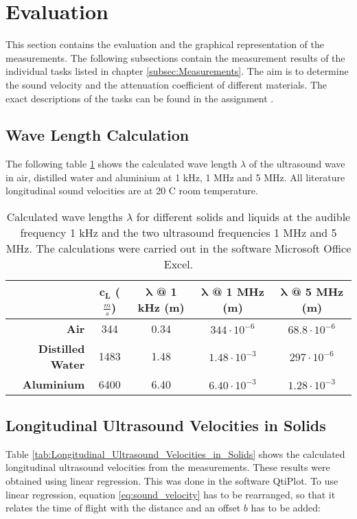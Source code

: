 \section{Evaluation}
\label{sec:Evaluation}
This section contains the evaluation and the graphical representation of the measurements. The following subsections contain the measurement results of the individual tasks listed in chapter \ref{subsec:Measurements}. The aim is to determine the sound velocity and the attenuation coefficient of different materials. The exact descriptions of the tasks can be found in the assignment \cite{ultrasound}.

\subsection{Wave Length Calculation}
\label{subsec:wave_length_calculation}
The following table \ref{tab:wave_length_calculation} shows the calculated wave length $\lambda$ of the ultrasound wave in air, distilled water and aluminium at 1 kHz, 1 MHz and 5 MHz. All literature longitudinal sound velocities are at 20 \textdegree C room temperature.

\begin{table}[H]
	\centering
	\renewcommand{\arraystretch}{1.3}
	\begin{tabular}{r||c|c|c|c}
		& $\boldsymbol{c_L}$ ($\frac{\si{m}}{\si{s}}$) \cite{kohlrausch} & $\boldsymbol{\lambda}$ \textbf{@ 1 kHz} (m) & $\boldsymbol{\lambda}$ \textbf{@ 1 MHz} (m) & $\boldsymbol{\lambda}$ \textbf{@ 5 MHz} (m) \\
		\hline\hline
		\textbf{Air} & 344 & 0.34 & $344\cdot 10^{-6}$ & $68.8\cdot 10^{-6}$ \\
		\textbf{Distilled Water} & 1483 & 1.48 & $1.48\cdot 10^{-3}$ & $297\cdot 10^{-6}$ \\
		\textbf{Aluminium} & 6400 & 6.40 & $6.40\cdot 10^{-3}$ & $1.28\cdot 10^{-3}$ \\
	\end{tabular}
	\caption{Calculated wave lengths $\lambda$ for different solids and liquids at the audible frequency 1 kHz and the two ultrasound frequencies 1 MHz and 5 MHz. The calculations were carried out in the software Microsoft Office Excel.}
	\label{tab:wave_length_calculation}
\end{table}

\subsection{Longitudinal Ultrasound Velocities in Solids}
\label{subsec:Longitudinal_Ultrasound_Velocities_in_Solids}
Table \ref{tab:Longitudinal_Ultrasound_Velocities_in_Solids} shows the calculated longitudinal ultrasound velocities from the measurements. These results were obtained using linear regression. This was done in the software QtiPlot. To use linear regression, equation \ref{eq:sound_velocity} has to be rearranged, so that it relates the time of flight with the distance and an offset $b$ has to be added:

